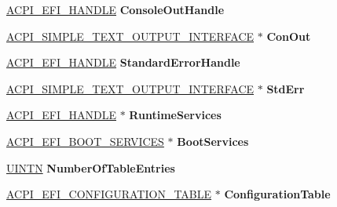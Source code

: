 \begin{DoxyCompactItemize}
\item 
\mbox{\label{struct___a_c_p_i___e_f_i___s_y_s_t_e_m___t_a_b_l_e_ab3c4ecbb389441ba6dfb5962fac84743}} 
\hyperlink{interfacevoid}{A\+C\+P\+I\+\_\+\+E\+F\+I\+\_\+\+H\+A\+N\+D\+LE} {\bfseries Console\+Out\+Handle}
\item 
\mbox{\label{struct___a_c_p_i___e_f_i___s_y_s_t_e_m___t_a_b_l_e_a1660615f04fe92ff3cc879147d463b0b}} 
\hyperlink{struct___a_c_p_i___s_i_m_p_l_e___t_e_x_t___o_u_t_p_u_t___i_n_t_e_r_f_a_c_e}{A\+C\+P\+I\+\_\+\+S\+I\+M\+P\+L\+E\+\_\+\+T\+E\+X\+T\+\_\+\+O\+U\+T\+P\+U\+T\+\_\+\+I\+N\+T\+E\+R\+F\+A\+CE} $\ast$ {\bfseries Con\+Out}
\item 
\mbox{\label{struct___a_c_p_i___e_f_i___s_y_s_t_e_m___t_a_b_l_e_abe385d1d466fc1f72a773f75aa306be2}} 
\hyperlink{interfacevoid}{A\+C\+P\+I\+\_\+\+E\+F\+I\+\_\+\+H\+A\+N\+D\+LE} {\bfseries Standard\+Error\+Handle}
\item 
\mbox{\label{struct___a_c_p_i___e_f_i___s_y_s_t_e_m___t_a_b_l_e_abc16b6f526d5c2cef14a8ff807424efa}} 
\hyperlink{struct___a_c_p_i___s_i_m_p_l_e___t_e_x_t___o_u_t_p_u_t___i_n_t_e_r_f_a_c_e}{A\+C\+P\+I\+\_\+\+S\+I\+M\+P\+L\+E\+\_\+\+T\+E\+X\+T\+\_\+\+O\+U\+T\+P\+U\+T\+\_\+\+I\+N\+T\+E\+R\+F\+A\+CE} $\ast$ {\bfseries Std\+Err}
\item 
\mbox{\label{struct___a_c_p_i___e_f_i___s_y_s_t_e_m___t_a_b_l_e_a7e8729f5acacac6b2f5fe45a1cb3c061}} 
\hyperlink{interfacevoid}{A\+C\+P\+I\+\_\+\+E\+F\+I\+\_\+\+H\+A\+N\+D\+LE} $\ast$ {\bfseries Runtime\+Services}
\item 
\mbox{\label{struct___a_c_p_i___e_f_i___s_y_s_t_e_m___t_a_b_l_e_ae1441f95e62b5be1d543a832f11dc096}} 
\hyperlink{struct___a_c_p_i___e_f_i___b_o_o_t___s_e_r_v_i_c_e_s}{A\+C\+P\+I\+\_\+\+E\+F\+I\+\_\+\+B\+O\+O\+T\+\_\+\+S\+E\+R\+V\+I\+C\+ES} $\ast$ {\bfseries Boot\+Services}
\item 
\mbox{\label{struct___a_c_p_i___e_f_i___s_y_s_t_e_m___t_a_b_l_e_afea7e97980ddf59fee593f6f1e6542b7}} 
\hyperlink{_processor_bind_8h_ac0b1ca9b01db611e0f7f2080a2699135}{U\+I\+N\+TN} {\bfseries Number\+Of\+Table\+Entries}
\item 
\mbox{\label{struct___a_c_p_i___e_f_i___s_y_s_t_e_m___t_a_b_l_e_a03752d5022f10651e46d1dd139dd6a00}} 
\hyperlink{struct___a_c_p_i___e_f_i___c_o_n_f_i_g_u_r_a_t_i_o_n___t_a_b_l_e}{A\+C\+P\+I\+\_\+\+E\+F\+I\+\_\+\+C\+O\+N\+F\+I\+G\+U\+R\+A\+T\+I\+O\+N\+\_\+\+T\+A\+B\+LE} $\ast$ {\bfseries Configuration\+Table}
\end{DoxyCompactItemize}


